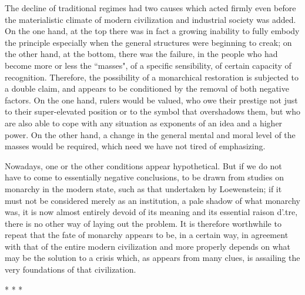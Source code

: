 The decline of traditional regimes had two causes which acted firmly even before the materialistic climate of modern civilization and industrial society was added. On the one hand, at the top there was in fact a growing inability to fully embody the principle especially when the general structures were beginning to creak; on the other hand, at the bottom, there was the failure, in the people who had become more or less the ``masses", of a specific sensibility, of certain capacity of recognition. Therefore, the possibility of a monarchical restoration is subjected to a double claim, and appears to be conditioned by the removal of both negative factors. On the one hand, rulers would be valued, who owe their prestige not just to their super-elevated position or to the symbol that overshadows them, but who are also able to cope with any situation as exponents of an idea and a higher power. On the other hand, a change in the general mental and moral level of the masses would be required, which need we have not tired of emphasizing.

Nowadays, one or the other conditions appear hypothetical. But if we do not have to come to essentially negative conclusions, to be drawn from studies on monarchy in the modern state, such as that undertaken by Loewenstein; if it must not be considered merely as an institution, a pale shadow of what monarchy was, it is now almost entirely devoid of its meaning and its essential raison d'.tre, there is no other way of laying out the problem. It is therefore worthwhile to repeat that the fate of monarchy appears to be, in a certain way, in agreement with that of the entire modern civilization and more properly depends on what may be the solution to a crisis which, as appears from many clues, is assailing the very foundations of that civilization.


\begin{center}* * *\end{center}

